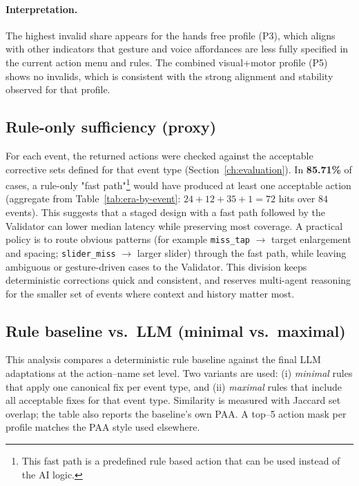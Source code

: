 \paragraph{Interpretation.}
The highest invalid share appears for the hands free profile (P3), which aligns with other indicators that gesture and voice affordances are less fully specified in the current action menu and rules. The combined visual+motor profile (P5) shows no invalids, which is consistent with the strong alignment and stability observed for that profile.


\subsection{Rule-only sufficiency (proxy)}
For each event, the returned actions were checked against the acceptable corrective sets defined for that event type (Section~\ref{ch:evaluation}). In \textbf{85.71\%} of cases, a rule-only "fast path"\footnote{This fast path is a predefined rule based action that can be used instead of the AI logic.} would have produced at least one acceptable action (aggregate from Table~\ref{tab:era-by-event}: $24{+}12{+}35{+}1=72$ hits over $84$ events). This suggests that a staged design with a fast path followed by the Validator can lower median latency while preserving most coverage. A practical policy is to route obvious patterns (for example \texttt{miss\_tap} $\rightarrow$ target enlargement and spacing; \texttt{slider\_miss} $\rightarrow$ larger slider) through the fast path, while leaving ambiguous or gesture-driven cases to the Validator. This division keeps deterministic corrections quick and consistent, and reserves multi-agent reasoning for the smaller set of events where context and history matter most.

\subsection{Rule baseline vs.\ LLM (minimal vs.\ maximal)}
This analysis compares a deterministic rule baseline against the final LLM adaptations at the action–name set level. Two variants are used: (i) \emph{minimal} rules that apply one canonical fix per event type, and (ii) \emph{maximal} rules that include all acceptable fixes for that event type. Similarity is measured with Jaccard set overlap; the table also reports the baseline’s own PAA. A top–5 action mask per profile matches the PAA style used elsewhere.

